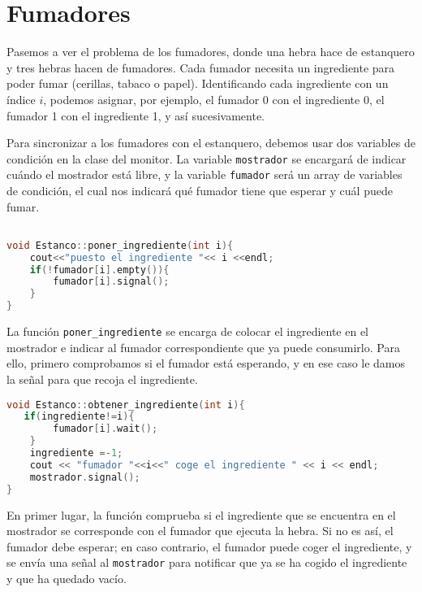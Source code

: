 \documentclass{article}
\begin{document}
\section{Fumadores}
Pasemos a ver el problema de los fumadores, donde una hebra hace de estanquero y tres hebras hacen de fumadores. Cada fumador necesita un ingrediente para poder fumar (cerillas, tabaco o papel). Identificando cada ingrediente con un índice \(i\), podemos asignar, por ejemplo, el fumador 0 con el ingrediente 0, el fumador 1 con el ingrediente 1, y así sucesivamente.

Para sincronizar a los fumadores con el estanquero, debemos usar dos variables de condición en la clase del monitor. La variable \texttt{mostrador} se encargará de indicar cuándo el mostrador está libre, y la variable \texttt{fumador} será un array de variables de condición, el cual nos indicará qué fumador tiene que esperar y cuál puede fumar.


\begin{lstlisting}[language=C++,caption=función poner_ingrediente]

void Estanco::poner_ingrediente(int i){
	cout<<"puesto el ingrediente "<< i <<endl;
	if(!fumador[i].empty()){
		fumador[i].signal();
	}
}
\end{lstlisting}
La función \texttt{poner\_ingrediente} se encarga de colocar el ingrediente en el mostrador e indicar al fumador correspondiente que ya puede consumirlo. Para ello, primero comprobamos si el fumador está esperando, y en ese caso le damos la señal para que recoja el ingrediente.

\begin{lstlisting}[language=C++,caption=función obtener_ingrediente ] 
void Estanco::obtener_ingrediente(int i){
   if(ingrediente!=i){
		fumador[i].wait();
	}
	ingrediente =-1;
	cout << "fumador "<<i<<" coge el ingrediente " << i << endl;
	mostrador.signal();
}
\end{lstlisting}
En primer lugar, la función comprueba si el ingrediente que se encuentra en el mostrador se corresponde con el fumador que ejecuta la hebra. Si no es así, el fumador debe esperar; en caso contrario, el fumador puede coger el ingrediente, y se envía una señal al \texttt{mostrador} para notificar que ya se ha cogido el ingrediente y que ha quedado vacío.
\end{document}
